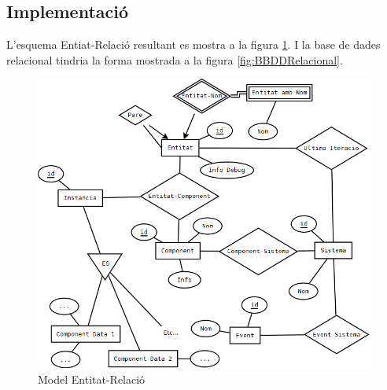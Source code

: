   \subsection{Implementació}

  L'esquema Entiat-Relació resultant es mostra a la figura \ref{fig:EntitatRelacio}. I la base de dades relacional tindria la forma mostrada a la figura \ref{fig:BBDDRelacional}.

  \begin{figure}
    \includegraphics[width=1\linewidth]{./img/EntitatRelacio.png}
    \caption{Model Entitat-Relació \label{fig:EntitatRelacio}}
  \end{figure}

